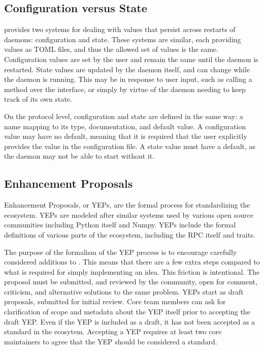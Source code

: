 \subsection{Configuration versus State}

\yaq{} provides two systems for dealing with values that persist across restarts of daemons: configuration and state.
These systems are similar, each providing values as TOML files, and thus the allowed set of values is the same.
Configuration values are set by the user and remain the same until the daemon is restarted.
State values are updated by the daemon itself, and can change while the daemon is running.
This may be in response to user input, such as calling a method over the \yaq{} interface, or simply by virtue of the daemon needing to keep track of its own state.

On the protocol level, configuration and state are defined in the same way: a name mapping to its type, documentation, and default value.
A configuration value may have no default, meaning that it is required that the user explicitly provides the value in the configuration file.
A state value must have a default, as the daemon may not be able to start without it.

\subsection{\yaq{} Enhancement Proposals}

\yaq{} Enhancement Proposals, or YEPs, are the formal process for standardizing the \yaq{} ecosystem.
YEPs are modeled after similar systems used by various open source communities including Python itself\cite{} and Numpy\cite{}.
YEPs include the formal definitions of various parts of the \yaq{} ecosystem, including the RPC itself and traits.

The purpose of the formalism of the YEP process is to encourage carefully considered additions to \yaq{}.
This means that there are a few extra steps compared to what is required for simply implementing an idea.
This friction is intentional.
The proposol must be submitted, and reviewed by the community, open for comment, criticism, and alternative solutions to the same problem.
YEPs start as draft proposals, submitted for initial review.
Core team members can ask for clarification of scope and metadata about the YEP itself prior to accepting the draft YEP.
Even if the YEP is included as a draft, it has not been accepted as a standard in the \yaq{} ecosytem.
Accepting a YEP requires at least two core maintainers to agree that the YEP should be considered a standard.

